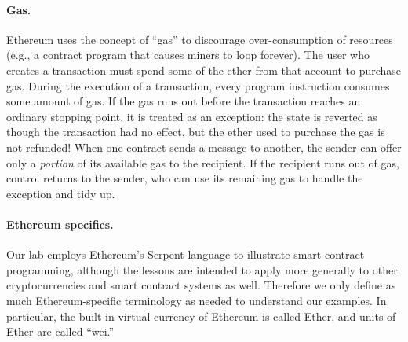 \documentclass[10pt,twocolumn,letterpaper]{article}
\newcommand{\ignore}[1]{}
\begin{document}
\ignore{
\paragraph{Transactions, Messages and Gas.}
A transaction always begins with a message from a user to some recipient address (either another user or a contract). This message must be signed by the user, and can contain data, ether, or both. If the recipient is a contract, then the code of that contract is executed. If that code contains an instruction to send a message to another contract, then that contract's code is executed next. So, a transaction must contain at least one message, but can trigger several messages before it completes.

Messages act a bit like function calls in ordinary programming languages. After a contract finishes processing a message it receives, it can pass a return value back to the sender.

In some cases, a contract can encounter an ``exception'' (e.g., because of an invalid instruction). After an exception, control is also returned to the sender along with a special return code. The state of \emph{all} contract, including account balances and storage, is reverted to what it was just prior to calling the exception-causing message.
}

\paragraph{Gas.}
Ethereum uses 
the concept of ``gas'' to discourage over-consumption of resources (e.g.,
a contract program that causes miners to loop forever). The user who creates a transaction must spend some of the ether from that account to purchase gas. During the execution of a transaction, every program instruction consumes some amount of gas. If the gas runs out before the transaction reaches an ordinary stopping point, it is treated as an exception: the state is reverted as though the transaction had no effect, but the ether used to purchase the gas is not refunded! When one contract sends a message to another, the sender can offer only a \emph{portion} of its available gas to the recipient. If the recipient runs out of gas, control returns to the sender, who can use its remaining gas to handle the exception and tidy up.


\paragraph{Ethereum specifics.}
Our lab employs Ethereum's Serpent language 
to illustrate smart contract programming, although the lessons are intended to apply more generally to other cryptocurrencies and smart contract systems as well. Therefore we only define as much Ethereum-specific terminology as needed to understand our examples. In particular, the built-in virtual currency of Ethereum is called Ether, and units of Ether are called ``wei.''
\end{document}

